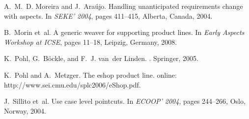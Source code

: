 \documentclass{sig-alt-full}
\begin{document}
\begin{thebibliography}{10}
A.~M.~D. Moreira and J.~Ara{\'u}jo.
\newblock Handling unanticipated requirements change with aspects.
\newblock In {\em SEKE' 2004}, pages 411--415, Alberta, Canada, 2004.

B.~Morin et~al.
\newblock A generic weaver for supporting product lines.
\newblock In {\em Early Aspects Workshop at ICSE}, pages 11--18, Leipzig,
  Germany, 2008.

K.~Pohl, G.~B\"{o}ckle, and F.~J. van~der Linden.
.
\newblock Springer, 2005.

K.~Pohl and A.~Metzger.
\newblock The eshop product line.
\newblock online: http://www.sei.cmu.edu/splc2006/eShop.pdf.

J.~Sillito et~al.
\newblock Use case level pointcuts.
\newblock In {\em ECOOP' 2004}, pages 244--266, Oslo, Norway, 2004.

\end{thebibliography}
\end{document}
